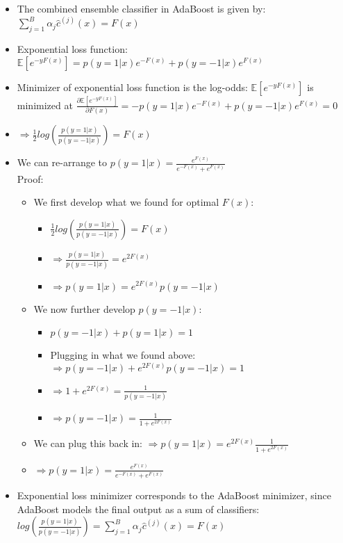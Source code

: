 \begin{itemize}
    \item The combined ensemble classifier in AdaBoost is given by: $\sum_{j=1}^B \alpha_j \hat{c}^{(j)}(x) = F(x)$
    \item Exponential loss function: $\mathbb{E} [ e^{-y F(x)} ] = p(y=1 | x) e^{-F(x)} + p(y=-1 | x) e^{F(x)}$
    \item Minimizer of exponential loss function is the log-odds: $\mathbb{E} [ e^{-y F(x)} ]$ is minimized at $\frac{ \partial \mathbb{E} [ e^{-y F(x)} ] }{ \partial F(x) } = -p(y=1 | x) e^{-F(x)} + p(y=-1 | x) e^{F(x)} = 0 $
    \item $\Rightarrow \frac{1}{2} log ( \frac{ p(y=1 | x) }{ p(y=-1 | x) } ) = F(x)$
    \item We can re-arrange to $p(y=1 | x) = \frac{ e^{F(x)} }{  e^{-F(x)} +  e^{F(x)} }$\\
    Proof:
    \begin{itemize}
        \item We first develop what we found for optimal $F(x)$: 
        \begin{itemize}
            \item $\frac{1}{2} log ( \frac{ p(y=1 | x) }{ p(y=-1 | x) } ) = F(x)$
            \item $\Rightarrow \frac{ p(y=1 | x) }{ p(y=-1 | x) } = e^{2F(x)}$
            \item $\Rightarrow p(y=1 | x) = e^{2F(x)} { p(y=-1 | x) }$
        \end{itemize}
        \item We now further develop $p(y=-1 | x)$:
        \begin{itemize}
            \item $p(y=-1 | x) + p(y=1 | x) = 1$
            \item Plugging in what we found above: $\Rightarrow p(y=-1 | x) + e^{2F(x)} { p(y=-1 | x) } = 1$
            \item $\Rightarrow 1 + e^{2F(x)} = \frac{1}{ p(y=-1 | x) }$
            \item $\Rightarrow p(y=-1 | x) = \frac{1}{ 1 + e^{2F(x)} }$
        \end{itemize}
        \item We can plug this back in: $\Rightarrow p(y=1 | x) = e^{2F(x)} \frac{1}{ 1 + e^{2F(x)} }$
        \item $\Rightarrow p(y=1 | x) = \frac{e^{F(x)}}{ e^{-F(x)} + e^{F(x)} }$
    \end{itemize}
    \item Exponential loss minimizer corresponds to the AdaBoost minimizer, since AdaBoost models the final output as a sum of classifiers: $log ( \frac{ p(y=1 | x) }{ p(y=-1 | x) } ) = \sum_{j=1}^B \alpha_j \hat{c}^{(j)}(x) = F(x)$
\end{itemize}
